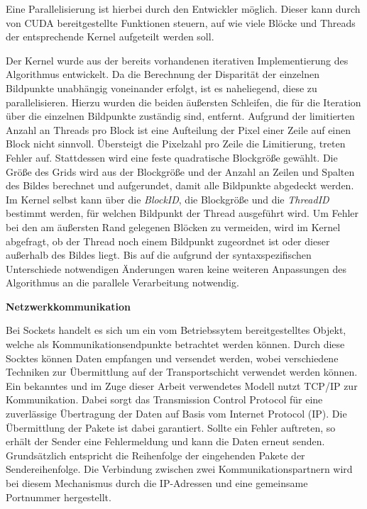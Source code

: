 \documentclass[times, 10pt,twocolumn]{article}
\begin{document}
Eine Parallelisierung ist hierbei durch den Entwickler möglich. Dieser kann durch von CUDA bereitgestellte Funktionen steuern, auf wie viele Blöcke und Threads der entsprechende Kernel aufgeteilt werden soll.


Der Kernel wurde aus der bereits vorhandenen iterativen Implementierung des Algorithmus entwickelt. Da die Berechnung der Disparität der einzelnen Bildpunkte unabhängig voneinander erfolgt, ist es naheliegend, diese zu parallelisieren. Hierzu wurden die beiden äußersten Schleifen, die für die Iteration über die einzelnen Bildpunkte zuständig sind, entfernt.  
Aufgrund der limitierten Anzahl an Threads pro Block ist eine Aufteilung der Pixel einer Zeile auf einen Block nicht sinnvoll. Übersteigt die Pixelzahl pro Zeile die Limitierung, treten Fehler auf. Stattdessen wird eine feste quadratische Blockgröße gewählt. Die Größe des Grids wird aus der Blockgröße und der Anzahl an Zeilen und Spalten des Bildes berechnet und aufgerundet, damit alle Bildpunkte abgedeckt werden. Im Kernel selbst kann über die \textit{BlockID}, die Blockgröße und die \textit{ThreadID} bestimmt werden, für welchen Bildpunkt der Thread ausgeführt wird. Um Fehler bei den am äußersten Rand gelegenen Blöcken zu vermeiden, wird im Kernel abgefragt, ob der Thread noch einem Bildpunkt zugeordnet ist oder dieser außerhalb des Bildes liegt.
Bis auf die aufgrund der syntaxspezifischen Unterschiede notwendigen Änderungen waren keine weiteren Anpassungen des Algorithmus an die parallele Verarbeitung notwendig.


\textbf{Netzwerkkommunikation}

Bei Sockets handelt es sich um ein vom Betriebssytem bereitgestelltes Objekt, welche als Kommunikationsendpunkte betrachtet werden können. Durch diese Socktes können Daten empfangen und versendet werden, wobei verschiedene Techniken zur Übermittlung auf der Transportschicht verwendet werden können.
Ein bekanntes und im Zuge dieser Arbeit verwendetes Modell nutzt TCP/IP zur Kommunikation. Dabei sorgt das Transmission Control Protocol für eine zuverlässige Übertragung der Daten auf Basis vom Internet Protocol (IP). Die Übermittlung der Pakete ist dabei garantiert. Sollte ein Fehler auftreten, so erhält der Sender eine Fehlermeldung und kann die Daten erneut senden. Grundsätzlich entspricht die Reihenfolge der eingehenden Pakete der Sendereihenfolge.
Die Verbindung zwischen zwei Kommunikationspartnern wird bei diesem Mechanismus durch die IP-Adressen und eine gemeinsame Portnummer hergestellt.
\end{document}
